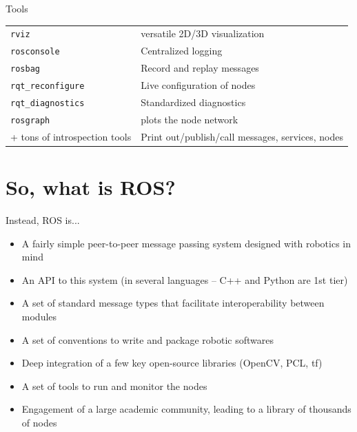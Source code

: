\documentclass[compress]{beamer}
\begin{document}
\begin{frame}{Tools}
    \begin{table}[]
        \begin{tabularx}{\linewidth}{l>{\raggedright}X}
            \toprule
            \texttt{rviz} & versatile 2D/3D visualization \tabularnewline
            \texttt{rosconsole} & Centralized logging \tabularnewline
            \texttt{rosbag} & Record and replay messages \tabularnewline
            \texttt{rqt\_reconfigure} & Live configuration of nodes \tabularnewline
            \texttt{rqt\_diagnostics} & Standardized diagnostics \tabularnewline
            \texttt{rosgraph} & plots the node network \tabularnewline
            + tons of introspection tools & Print out/publish/call messages, services, nodes \tabularnewline
            \bottomrule
        \end{tabularx}
    \end{table}
\end{frame}



\section{So, what is ROS?}

\begin{frame}{Instead, ROS is...}
    \begin{itemize}
        \item<+-> A fairly simple peer-to-peer message passing system designed with robotics in
            mind
        \item<+-> An API to this system (in several languages -- C++ and Python are
            1st tier)
        \item<+-> A set of standard message types that facilitate interoperability between modules
        \item<+-> A set of conventions to write and package robotic softwares
        \item<+-> Deep integration of a few key open-source libraries (OpenCV, PCL, tf)
        \item<+-> A set of tools to run and monitor the nodes
        \item<+-> Engagement of a large academic community, leading to a library of thousands of nodes
    \end{itemize}
\end{frame}
\end{document}
